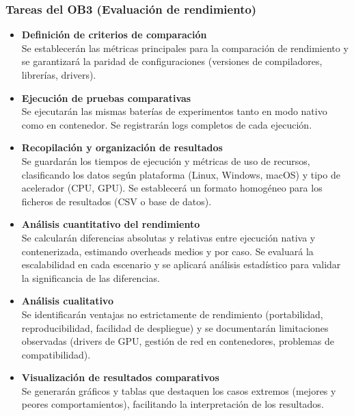\subsubsection{Tareas del OB3 (Evaluación de rendimiento)}\label{subsubsec:tareas_ob3}

\begin{itemize}
    \item \textbf{Definición de criterios de comparación} \\
          Se establecerán las métricas principales para la comparación de rendimiento y se garantizará la paridad de configuraciones (versiones de compiladores, librerías, drivers).

    \item \textbf{Ejecución de pruebas comparativas} \\
          Se ejecutarán las mismas baterías de experimentos tanto en modo nativo como en contenedor. Se registrarán logs completos de cada ejecución.

    \item \textbf{Recopilación y organización de resultados} \\
          Se guardarán los tiempos de ejecución y métricas de uso de recursos, clasificando los datos según plataforma (Linux, Windows, macOS) y tipo de acelerador (CPU, GPU). Se establecerá un formato homogéneo para los ficheros de resultados (CSV o base de datos).

    \item \textbf{Análisis cuantitativo del rendimiento} \\
          Se calcularán diferencias absolutas y relativas entre ejecución nativa y contenerizada, estimando overheads medios y por caso. Se evaluará la escalabilidad en cada escenario y se aplicará análisis estadístico para validar la significancia de las diferencias.

    \item \textbf{Análisis cualitativo} \\
          Se identificarán ventajas no estrictamente de rendimiento (portabilidad, reproducibilidad, facilidad de despliegue) y se documentarán limitaciones observadas (drivers de GPU, gestión de red en contenedores, problemas de compatibilidad).

    \item \textbf{Visualización de resultados comparativos} \\
          Se generarán gráficos y tablas que destaquen los casos extremos (mejores y peores comportamientos), facilitando la interpretación de los resultados.
\end{itemize}

